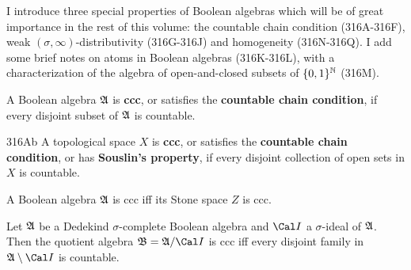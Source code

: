 
\def\chaptername{Boolean algebras}
\def\sectionname{Further topics}


I introduce
three special properties of Boolean algebras which will be of great
importance in the rest of this volume:
the countable chain condition (316A-316F), weak
$(\sigma,\infty)$-distributivity (316G-316J) and homogeneity
(316N-316Q). %
I add some brief notes on atoms in Boolean algebras (316K-316L),
with a characterization of the algebra of open-and-closed subsets of
$\{0,1\}^{\Bbb N}$ (316M).

 A Boolean algebra $\frak A$ is {\bf ccc},
or satisfies the {\bf countable chain condition}, if every disjoint
subset of $\frak A$ is countable.

\spheader 316Ab A topological space $X$ is {\bf ccc}, or
satisfies the {\bf countable chain condition}, or has {\bf Souslin's
property}, if every disjoint
collection of open sets in $X$ is countable.

 A Boolean algebra $\frak A$ is ccc iff its Stone
space $Z$ is ccc.


 Let $\frak A$ be a Dedekind
$\sigma$-complete Boolean algebra and $\Cal I$ a $\sigma$-ideal of
$\frak A$.   Then the quotient algebra $\frak B=\frak A/\Cal I$ is ccc
iff every disjoint family in $\frak A\setminus\Cal I$ is countable.

